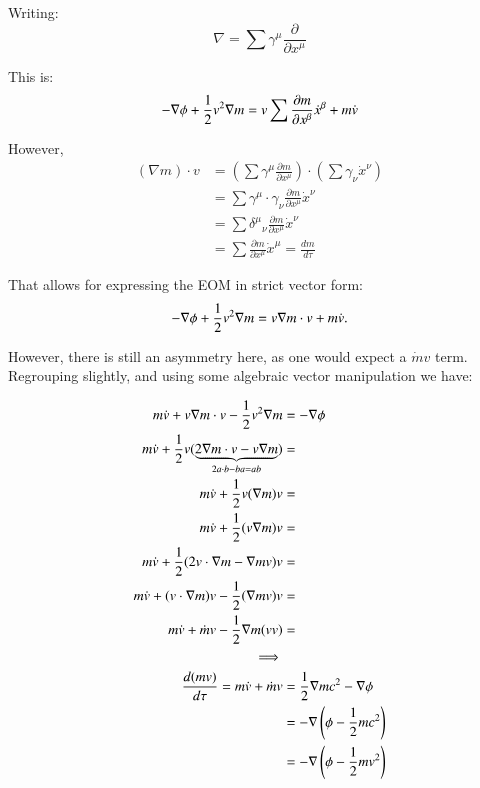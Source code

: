 \documentclass{article}      %
\newcommand{\grad}[0]{\nabla}
\newcommand{\PD}[2]{\frac{\partial {#2}}{\partial {#1}}}
\newcommand{\xdot}[0]{\dot{x}}
\newcommand{\vdot}[0]{\dot{v}}
\newcommand{\mdot}[0]{\dot{m}}
\begin{document}
Writing:
\begin{equation*}
\nabla = \sum \gamma^{\mu} \frac{\partial}{\partial x^{\mu}}
\end{equation*}

This is:
\begin{equation*}
- \grad \phi + \inv{2} v^2 \grad m = v \sum \PD{x^{\beta}}{m} \xdot^{\beta} + m \vdot 
\end{equation*}

However, 
\begin{align*}
(\grad m) \cdot v 
&= 
\left(\sum \gamma^{\mu} \PD{x^{\mu}}{m}\right) \cdot \left( \sum \gamma_{\nu} \xdot^{\nu} \right) \\
&= \sum \gamma^{\mu} \cdot \gamma_{\nu} \PD{x^{\mu}}{m} \xdot^{\nu} \\
&= \sum {\delta^{\mu}}_{\nu} \PD{x^{\mu}}{m} \xdot^{\nu} \\
&= \sum \PD{x^{\mu}}{m} \xdot^{\mu} = \frac{dm}{d\tau}
\end{align*}

That allows for expressing the EOM in strict vector form:
\begin{equation*}
- \grad \phi + \inv{2} v^2 \grad m = v \grad m \cdot v + m \vdot.
\end{equation*}

However, there is still an asymmetry here, as one would expect a $\mdot v$ term.  Regrouping slightly, and using some algebraic vector
manipulation we have:

\begin{align*}
m \vdot + v \grad m \cdot v - \inv{2} v^2 \grad m &= - \grad \phi \\
m \vdot + \inv{2} v ( \underbrace{2 \grad m \cdot v - v \grad m}_{2 a \cdot b - b a = a b}) &= \\
m \vdot + \inv{2} v (\grad m) v &= \\
m \vdot + \inv{2} (v \grad m) v &= \\
m \vdot + \inv{2} (2 v \cdot \grad m - \grad m v) v &= \\
m \vdot + (v \cdot \grad m) v - \inv{2} (\grad m v) v &= \\
m \vdot + \mdot v - \inv{2} \grad m (v v) &= \\
\implies \\
\frac{d (m v)}{d\tau} = m \vdot + \mdot v
&= \inv{2} \grad m c^2 -\grad \phi \\
&= -\grad \left(\phi - \inv{2} m c^2 \right) \\
&= -\grad \left(\phi - \inv{2} m v^2 \right) \\
\end{align*}
\end{document}

